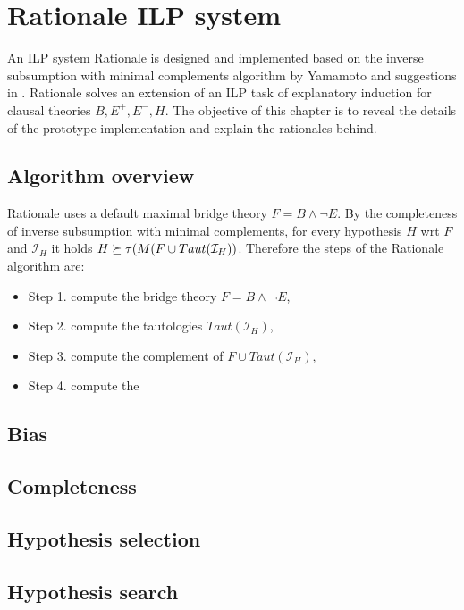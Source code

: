 \chapter{Rationale ILP system}
An ILP system Rationale is designed and implemented based on the inverse subsumption with minimal complements algorithm  by Yamamoto\cite{yamamoto2012inverse} and suggestions in . Rationale solves an extension of an ILP task of explanatory induction for clausal theories $B, E^+, E^-, H$. The objective of this chapter is to reveal the details of the prototype implementation and explain the rationales behind.

\section{Algorithm overview}
Rationale uses a default maximal bridge theory $F=B \land \neg E$. By the completeness of inverse subsumption with minimal complements, for every hypothesis $H$ wrt $F$ and $\mathcal{I}_H$ it holds $H \succeq \tau(M(F \cup Taut(\mathcal{I}_H))$. Therefore the steps of the Rationale algorithm are:
\begin{itemize}
\item Step 1. compute the bridge theory $F=B \land \neg E$,
\item Step 2. compute the tautologies $Taut(\mathcal{I}_H)$,
\item Step 3. compute the complement of $F \cup Taut(\mathcal{I}_H)$,
\item Step 4. compute the 
\end{itemize}

\section{Bias}

\section{Completeness}

\section{Hypothesis selection}

\section{Hypothesis search}

